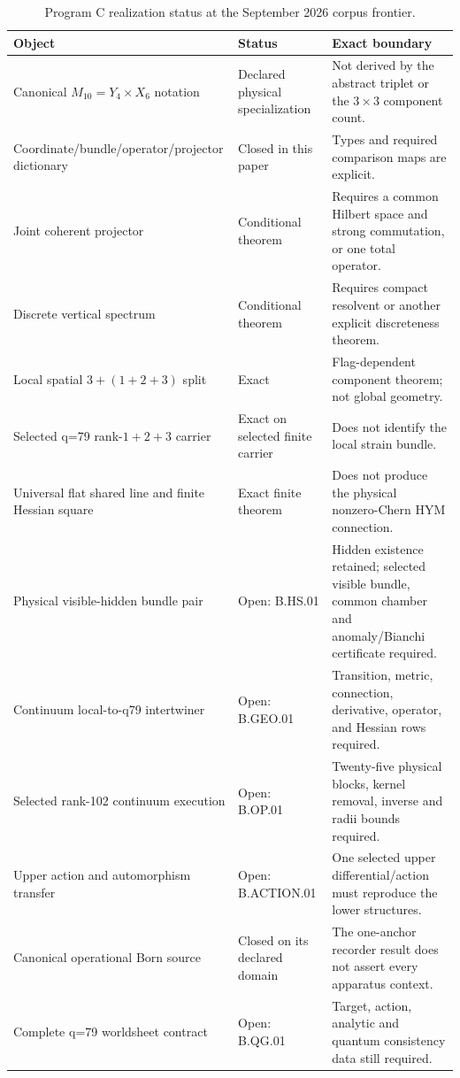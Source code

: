 \documentclass[11pt]{article}
\begin{document}
\begin{table}[ht]
\centering
\small
\renewcommand{\arraystretch}{1.18}
\begin{tabularx}{\textwidth}{@{}Y P{0.19\textwidth}P{0.35\textwidth}@{}}
\hline
Object & Status & Exact boundary \\
\hline
Canonical $M_{10}=Y_4\times X_6$ notation &
Declared physical specialization &
Not derived by the abstract triplet or the $3\times3$ component count. \\
Coordinate/bundle/operator/projector dictionary &
Closed in this paper &
Types and required comparison maps are explicit. \\
Joint coherent projector &
Conditional theorem &
Requires a common Hilbert space and strong commutation, or one total
operator. \\
Discrete vertical spectrum &
Conditional theorem &
Requires compact resolvent or another explicit discreteness theorem. \\
Local spatial $3+(1+2+3)$ split &
Exact &
Flag-dependent component theorem; not global geometry. \\
Selected q=79 rank-$1+2+3$ carrier &
Exact on selected finite carrier &
Does not identify the local strain bundle. \\
Universal flat shared line and finite Hessian square &
Exact finite theorem &
Does not produce the physical nonzero-Chern HYM connection. \\
Physical visible-hidden bundle pair &
Open: B.HS.01 &
Hidden existence retained; selected visible bundle, common chamber and
anomaly/Bianchi certificate required. \\
Continuum local-to-q79 intertwiner &
Open: B.GEO.01 &
Transition, metric, connection, derivative, operator, and Hessian rows
required. \\
Selected rank-102 continuum execution &
Open: B.OP.01 &
Twenty-five physical blocks, kernel removal, inverse and radii bounds required. \\
Upper action and automorphism transfer &
Open: B.ACTION.01 &
One selected upper differential/action must reproduce the lower structures. \\
Canonical operational Born source &
Closed on its declared domain &
The one-anchor recorder result does not assert every apparatus context. \\
Complete q=79 worldsheet contract &
Open: B.QG.01 &
Target, action, analytic and quantum consistency data still required. \\
\hline
\end{tabularx}
\caption{Program C realization status at the September 2026 corpus frontier.}
\label{tab:ledger}
\end{table}
\end{document}
